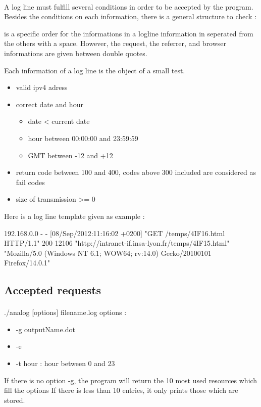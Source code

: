 \documentclass[a4paper, 12pts]{article}
\begin{document}
\paragraph{}
 A log line must fulfill several conditions in order to be accepted by the program. Besides the conditions on each information, there is a general structure to check :
 \begin{itemize}[label=$\square$]
 \there is a specific order for the informations in a logline
 \each information in seperated from the others with a space. However, the request, the referrer, and browser informations are given between double quotes.
 \end{itemize}
 Each information of a log line is the object of a small test.
 \begin{itemize}[label=$\square$]
 \item valid ipv4 adress
 \item correct date and hour
 \begin{itemize}
 \item date < current date
 \item hour between 00:00:00 and 23:59:59
 \item GMT between -12 and +12
 \end{itemize}
 \item return code between 100 and 400, codes above 300 included are considered as fail codes
 \item size of transmission >= 0
 \end{itemize}
Here is a log line template given as example :

192.168.0.0 - - [08/Sep/2012:11:16:02 +0200] "GET /temps/4IF16.html HTTP/1.1" 200 12106 "http://intranet-if.insa-lyon.fr/temps/4IF15.html" "Mozilla/5.0 (Windows NT 6.1; WOW64; rv:14.0) Gecko/20100101 Firefox/14.0.1"
 
\subsection{Accepted requests}
\paragraph{}
 ./analog [options] filename.log
 options :
 \begin{itemize}[label=$\square$]
 \item -g outputName.dot
 \item -e
 \item -t hour : hour between 0 and 23
 \end{itemize}
 If there is no option -g, the program will return the 10 most used resources which fill the options
 If there is less than 10 entries, it only prints those which are stored.
\end{document}
